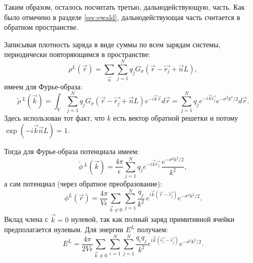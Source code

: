 Таким образом, осталось посчитать третью, дальнодействующую, часть.
Как было отмечено в разделе \ref{sec:ewald}, дальнодействующая часть считается в обратном пространстве.

Записывая плотность заряда в виде суммы по всем зарядам системы, периодически повторяющимся в пространстве:
\begin{equation*}
    \rho^L (\vec{r}) = \sum_\vec{n} \sum_{j=1}^N q_j G_\sigma (\vec{r} - \vec{r_j} + \vec{n}L),
\end{equation*}
имеем для Фурье-образа:
\begin{equation*}
    \tilde{\rho}\,^L (\vec{k}) = \int_V \sum_{j=1}^N q_j G_\sigma(\vec{r} - \vec{r_j} + \vec{n}L) e^{-i\vec{k}\vec{r}} d \vec{r}
    = \sum_{j=1}^N q_j e^{-i \vec{k} \vec{r_j}} e^{-\sigma^2 k^2 / 2} d\vec{r}.
\end{equation*}
Здесь использован тот факт, что $k$ есть вектор обратной решетки и потому $\exp(-i \vec{k} \vec{n} L) = 1$.

Тогда для Фурье-образа потенциала имеем:
\begin{equation}
    \label{eq:jel:phi_L_fourier}
    \tilde{\phi}\,^L (\vec{k}) = \frac{4\pi}{\epsilon} \sum_{j=1}^N q_j e^{-i \vec{k} \vec{r_j}}\, \frac{ e^{-\sigma^2 k^2 / 2} }{ k^2 },
\end{equation}
а сам потенциал (через обратное преобразование):
\begin{equation}
    \label{eq:jel:phi_L_spatial}
    \phi^L (\vec{r}) = \frac{4\pi}{V \epsilon} \sum_{\vec{k} \neq 0} \sum_{j=1}^N \frac{q_j}{k^2}\, e^{i \vec{k} (\vec{r} - \vec{r_j})} e^{-\sigma^2 k^2 / 2}.
\end{equation}
Вклад члена с $\vec{k} = 0$ нулевой, так как полный заряд примитивной ячейки предполагается нулевым.
Для энергии $E^L$ получаем:
\begin{equation}
    \label{eq:jel:E_L_final}
    E^L = \frac{4\pi}{2V \epsilon} \sum_{\vec{k} \neq 0} \sum_{i=1}^N \sum_{j=1}^N \frac{q_i q_j}{k^2} e^{i \vec{k} (\vec{r_i} - \vec{r_j})} e^{-\sigma^2 k^2 / 2}.
\end{equation}

